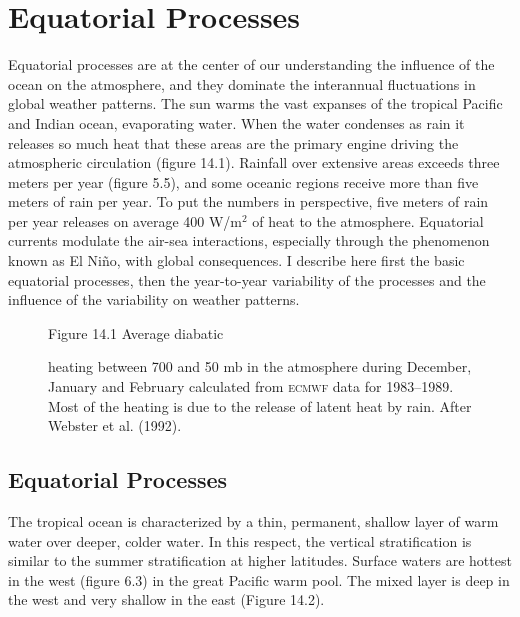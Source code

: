 \chapter{Equatorial Processes}
Equatorial processes are at the center of our understanding the influence of the ocean on the
atmosphere, and they dominate the interannual fluctuations in global weather patterns. The sun warms the vast expanses of the tropical Pacific and Indian ocean, evaporating water. When the water condenses as rain it releases so much heat that these areas are the primary engine driving the atmospheric circulation (figure 14.1). Rainfall over extensive areas exceeds three meters per year (figure 5.5), and some oceanic regions receive more than five meters of rain per year. To put the numbers in perspective,
five meters of rain per year releases on average 400 W/m$^2$ of heat to the atmosphere. Equatorial currents modulate the air-sea interactions, especially through the phenomenon known as El Ni\~{n}o, with global consequences. I describe here first the basic equatorial processes, then the year-to-year variability of the processes and the influence of the variability on weather patterns.

\begin{figure}[b!]
\vspace{-3ex}
\footnotesize
Figure 14.1 Average diabatic \rule{0pt}{3ex}heating between 700 and 50 mb in the
atmosphere during December, January and February calculated from \textsc{ecmwf} data for
1983--1989. Most of the heating is due to the release of latent heat by rain.
After Webster et al. (1992).
\label{fig:rainheat}
\end{figure}

\section{Equatorial Processes}
The tropical ocean is characterized by a thin, permanent, shallow layer of warm water
over deeper, colder water. In this respect, the vertical stratification is similar to the summer stratification at
higher latitudes. Surface waters are hottest in the west (figure 6.3) in the great Pacific warm pool. The mixed
layer is deep in the west and very shallow in the east (Figure
14.2).

